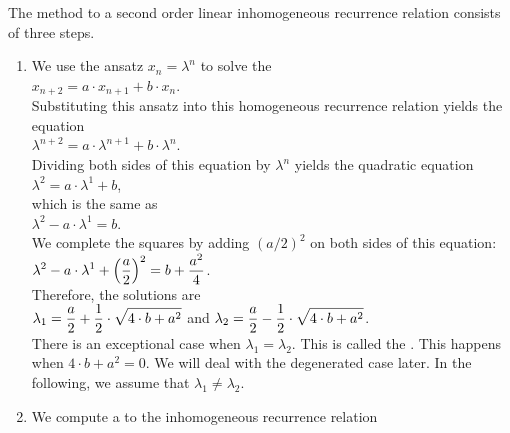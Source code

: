 \noindent
The method to  a second order linear inhomogeneous recurrence relation consists of three steps.
\begin{enumerate}
\item We use the ansatz $x_n = \lambda^n$ to solve the 
      \\[0.2cm]
      \hspace*{1.3cm}
      $x_{n+2} = a \cdot x_{n+1} + b \cdot x_n$.
      \\[0.2cm]
      Substituting this ansatz into this homogeneous recurrence relation yields the equation
      \\[0.2cm]
      \hspace*{1.3cm}
      $\lambda^{n+2} = a \cdot \lambda^{n+1} + b \cdot \lambda^n$.
      \\[0.2cm]
      Dividing both sides of this equation by $\lambda^n$ yields the quadratic equation
      \\[0.2cm]
      \hspace*{1.3cm}
      $\lambda^{2} = a \cdot \lambda^{1} + b$,
      \\[0.2cm]
      which is the same as
      \\[0.2cm]
      \hspace*{1.3cm}
      $\lambda^{2} - a \cdot \lambda^{1} = b$.
      \\[0.2cm]
      We complete the squares by adding $(a/2)^2$ on both sides of this equation:
      \\[0.2cm]
      \hspace*{1.3cm}
      $\displaystyle \lambda^{2} - a \cdot \lambda^{1} + \Bigl(\frac{a}{2}\Bigr)^2 = b + \frac{a^2}{4}$.
      \\[0.2cm]
      Therefore, the solutions are
      \\[0.2cm]
      \hspace*{1.3cm}
      $\displaystyle\lambda_1 = \frac{a}{2} + \frac{1}{2} \cdot \sqrt{4 \cdot b + a^2}$ \quad and \quad
      $\displaystyle\lambda_2 = \frac{a}{2} - \frac{1}{2} \cdot \sqrt{4 \cdot b + a^2}$.
      \\[0.2cm]
      There is an exceptional case when $\lambda_1 = \lambda_2$.  This is called the .
      This happens when $4 \cdot b + a^2 = 0$.  We will deal with the degenerated case later.  In the
      following, we assume that $\lambda_1 \not= \lambda_2$.
\item We compute a  to the inhomogeneous recurrence relation
      \\[0.2cm]

\end{enumerate}
